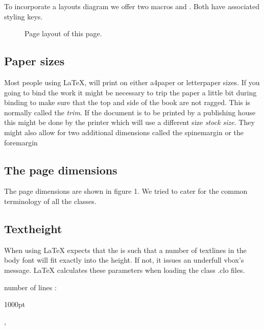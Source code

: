 To incorporate a layouts diagram we offer two macros  and . Both have associated styling keys.
\medskip

\printgeometryvalues

\begin{figure}
  \printlayout
  \caption{Page layout of this page.}
\end{figure}

\subsection{Paper sizes}
Most people using LaTeX, will print on either a4paper or letterpaper sizes. If you going to bind the work it might be necessary to trip the paper a little bit during binding to make sure that the top and side of the book are not ragged. This is normally called the \textit{trim}. If the document is to be printed by a publishing house this might be done by the printer which will use a different size \textit{stock size}. They might also allow for two additional dimensions called the spinemargin or the foremargin

\subsection{The page dimensions}

The page dimensions are shown in figure 1. We tried to cater for the common terminology of all the classes.

\subsection{Textheight}

When using  LaTeX expects that the  is such that a number of textlines in the body font will fit exactly into the height. If not, it issues an underfull vbox's message. LaTeX calculates these parameters when loading the class .clo files.
 
number of lines : \pgfmathresult

\expandafter\def\csname a4page\endcsname{1000pt}



\pgfmathresult,  \the\textheight \the\baselineskip

 \pgfmathresult

